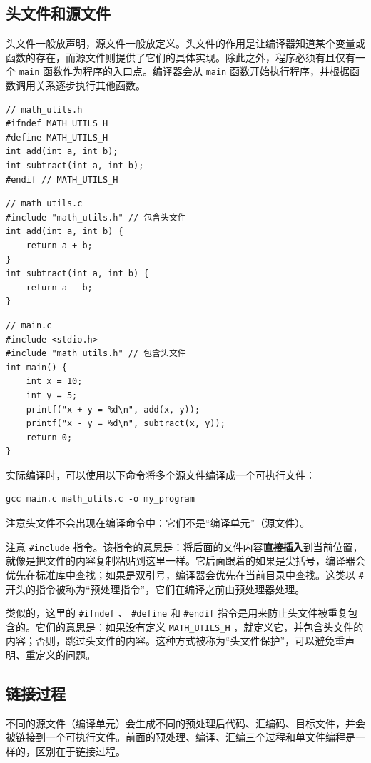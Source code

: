 \subsection{头文件和源文件}

头文件一般放声明，源文件一般放定义。头文件的作用是让编译器知道某个变量或函数的存在，而源文件则提供了它们的具体实现。除此之外，程序必须有且仅有一个 \verb|main| 函数作为程序的入口点。编译器会从 \verb|main| 函数开始执行程序，并根据函数调用关系逐步执行其他函数。

\begin{verbatim}
// math_utils.h
#ifndef MATH_UTILS_H
#define MATH_UTILS_H
int add(int a, int b);
int subtract(int a, int b);
#endif // MATH_UTILS_H
\end{verbatim}
\begin{verbatim}
// math_utils.c
#include "math_utils.h" // 包含头文件
int add(int a, int b) {
    return a + b;
}
int subtract(int a, int b) {
    return a - b;
}
\end{verbatim}
\begin{verbatim}
// main.c
#include <stdio.h>
#include "math_utils.h" // 包含头文件
int main() {
    int x = 10;
    int y = 5;
    printf("x + y = %d\n", add(x, y));
    printf("x - y = %d\n", subtract(x, y));
    return 0;
}
\end{verbatim}

实际编译时，可以使用以下命令将多个源文件编译成一个可执行文件：
\begin{verbatim}
gcc main.c math_utils.c -o my_program
\end{verbatim}
注意头文件不会出现在编译命令中：它们不是“编译单元”（源文件）。

注意 \verb|#include| 指令。该指令的意思是：将后面的文件内容\textbf{直接插入}到当前位置，就像是把文件的内容复制粘贴到这里一样。它后面跟着的如果是尖括号，编译器会优先在标准库中查找；如果是双引号，编译器会优先在当前目录中查找。这类以 \verb|#| 开头的指令被称为“预处理指令”，它们在编译之前由预处理器处理。

类似的，这里的 \verb|#ifndef| 、 \verb|#define| 和 \verb|#endif| 指令是用来防止头文件被重复包含的。它们的意思是：如果没有定义 \verb|MATH_UTILS_H| ，就定义它，并包含头文件的内容；否则，跳过头文件的内容。这种方式被称为“头文件保护”，可以避免重声明、重定义的问题。

\subsection{链接过程}

不同的源文件（编译单元）会生成不同的预处理后代码、汇编码、目标文件，并会被链接到一个可执行文件。前面的预处理、编译、汇编三个过程和单文件编程是一样的，区别在于链接过程。

